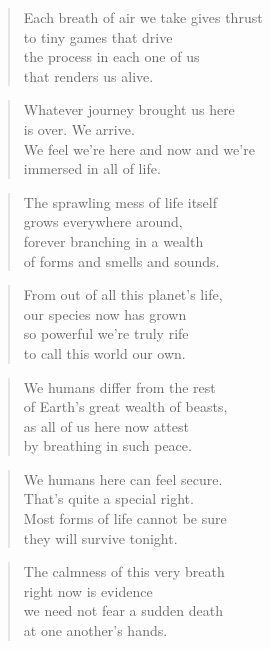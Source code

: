 \documentclass[14pt,a4paper]{article}
\begin{document}
\begin{verse}
Each breath of air we take gives thrust\\
to tiny games that drive\\
the process in each one of us\\
that renders us alive.
\end{verse}

\begin{verse}
Whatever journey brought us here\\
is over. We arrive.\\
We feel we’re here and now and we’re\\
immersed in all of life.
\end{verse}

\begin{verse}
The sprawling mess of life itself\\
grows everywhere around,\\
forever branching in a wealth\\
of forms and smells and sounds.
\end{verse}

\begin{verse}
From out of all this planet’s life,\\
our species now has grown\\
so powerful we’re truly rife\\
to call this world our own.
\end{verse}

\begin{verse}
We humans differ from the rest\\
of Earth’s great wealth of beasts,\\
as all of us here now attest\\
by breathing in such peace.
\end{verse}

\begin{verse}
We humans here can feel secure.\\
That’s quite a special right.\\
Most forms of life cannot be sure\\
they will survive tonight.
\end{verse}

\begin{verse}
The calmness of this very breath\\
right now is evidence\\
we need not fear a sudden death\\
at one another’s hands.
\end{verse}
\end{document}
